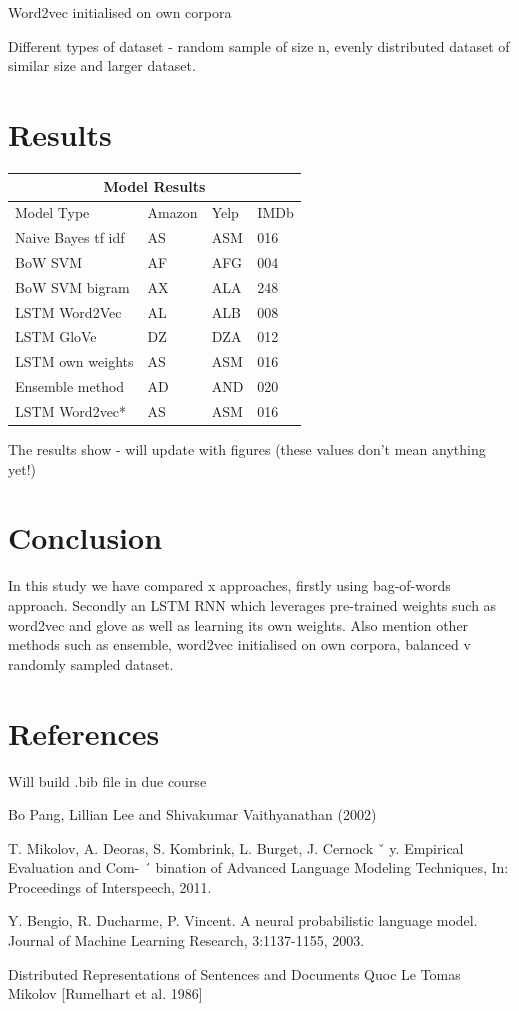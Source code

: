 \documentclass[conference]{IEEEtran}
\begin{document}
Word2vec initialised on own corpora

Different types of dataset - random sample of size n, evenly distributed dataset of similar size and larger dataset. 



\section{Results}

\begin{tabular}{ |p{3cm}||p{3cm}|p{3cm}|p{3cm}|  }
 \hline
 \multicolumn{4}{|c|}{Model Results} \\
 \hline
 Model Type& Amazon & Yelp & IMDb\\
 \hline
 Naive Bayes tf idf &   AS  & ASM&016\\
 BoW SVM   & AF    &AFG&   004\\
 BoW SVM bigram &   AX  & ALA   &248\\
 LSTM Word2Vec &AL & ALB&  008\\
 LSTM GloVe    &DZ & DZA&  012\\
 LSTM own weights &   AS  & ASM&016\\
 Ensemble method & AD  & AND   &020\\
 LSTM Word2vec* &   AS  & ASM&016\\
 \hline
\end{tabular}


The results show - will update with figures (these values don't mean anything yet!)

\section{Conclusion}

In this study we have compared x approaches, firstly using bag-of-words approach. Secondly an LSTM RNN which leverages pre-trained weights such as word2vec and glove as well as learning its own weights. Also mention other methods such as ensemble, word2vec initialised on own corpora, balanced v randomly sampled dataset.


\section{References}

Will build .bib file in due course 

Bo Pang, Lillian Lee and Shivakumar Vaithyanathan (2002)

T. Mikolov, A. Deoras, S. Kombrink, L. Burget, J. Cernock ˇ y. Empirical Evaluation and Com- ´
bination of Advanced Language Modeling Techniques, In: Proceedings of Interspeech, 2011.

Y. Bengio, R. Ducharme, P. Vincent. A neural probabilistic language model. Journal of Machine
Learning Research, 3:1137-1155, 2003.

Distributed Representations of Sentences and Documents
Quoc Le
Tomas Mikolov
[Rumelhart et al. 1986]
\end{document}
